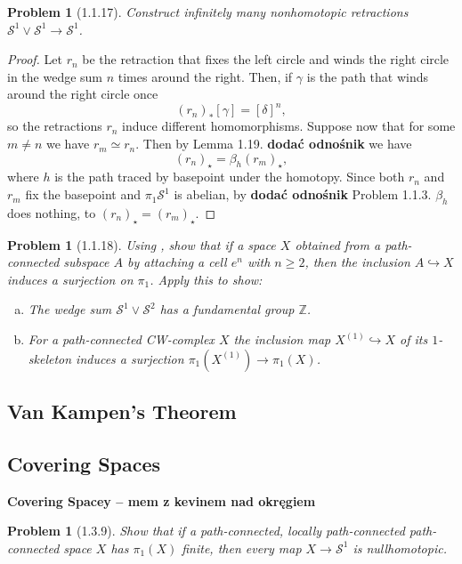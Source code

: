 \documentclass[11pt, a4paper, final]{amsart}
\newcommand{\Z}{{\mathbb{Z}}}
\newcommand\todo[1]{\textbf{\textcolor{redd}{#1}}}
\newcommand{\sphere}{\mathcal{S}}
\numberwithin{theorem}{section}
\newtheorem{problem}[theorem]{Problem}
\theoremstyle{definition}
\theoremstyle{remark}
\begin{document}
\begin{problem}[1.1.17]\label{problem: 1.1.17}
    Construct infinitely many nonhomotopic retractions $\sphere^1 \vee\sphere^1 \rightarrow \sphere^1$.
\end{problem}
\begin{proof}
    Let \( r_n \) be the retraction that fixes the left circle and winds the right circle in the wedge sum \( n \) times around the right. Then, if \( \gamma \) is the path that winds around the right circle once
\[ 
    (r_n)_*[\gamma] = [\delta]^n, 
\]
so the retractions \( r_n \) induce different homomorphisms. Suppose now that for some \( m \neq n \) we have \( r_m \simeq r_n \). Then by Lemma 1.19. \todo{dodać odnośnik} we have
\[ 
    (r_n)_\star = \beta_h (r_m)_\star,
\]
where \( h \) is the path traced by basepoint under the homotopy. Since both \( r_n \) and \( r_m \) fix the basepoint and \( \pi_1\sphere^1 \) is abelian, by \todo{dodać odnośnik} Problem 1.1.3. \( \beta_h \) does nothing, to \( (r_n)_\star = (r_m)_\star \).

\end{proof}
\begin{problem}[1.1.18]\label{problem: 1.1.18}
    Using \cite[Lemma 1.15]{AH}, show that if a space $X$ obtained from a path-connected subspace $A$ by attaching a cell $e^n$ with $n \geq 2$, then the inclusion $A \hookrightarrow X$ induces a surjection on $\pi_1$. Apply this to show:
    \begin{enumerate}[(a)]
        \item The wedge sum $\sphere^1 \vee\sphere^2$ has a fundamental group $\Z$.
        \item For a path-connected CW-complex $X$ the inclusion map $X^{(1)} \hookrightarrow X$ of its $1$-skeleton induces a surjection $\pi_1(X^{(1)}) \rightarrow \pi_1(X)$.
    \end{enumerate}
\end{problem}

\subsection{Van Kampen's Theorem}
\subsection{Covering Spaces} \todo{Covering Spacey -- mem z kevinem nad okręgiem}

\begin{problem}[1.3.9]\label{problem: 1.3.9.}
    Show that if a path-connected, locally path-connected path-connected space \( X \) has \( \pi_1(X) \) finite, then every map \( X \to \sphere^1 \) is nullhomotopic.
\end{problem}
\end{document}

